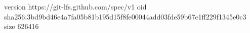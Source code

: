 version https://git-lfs.github.com/spec/v1
oid sha256:3bd9bd46e4a7fa05b81b195d15f8fe00044add03fde59b67c1ff229f1345e0c3
size 626416
